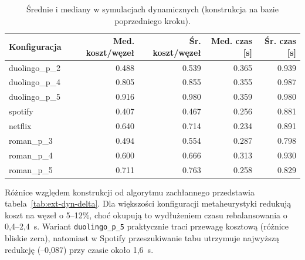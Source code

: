 \begin{table}[H]
  \centering
  \caption{Średnie i mediany w symulacjach dynamicznych (konstrukcja na bazie poprzedniego kroku).}
  \label{tab:ext-dyn-overall}
  \begin{tabular}{lrrrr}
    \toprule
    \textbf{Konfiguracja} & \textbf{Med. koszt/węzeł} & \textbf{Śr. koszt/węzeł} & \textbf{Med. czas [s]} & \textbf{Śr. czas [s]} \\
    \midrule
    duolingo\_p\_2        & 0.488                     & 0.539                    & 0.365                  & 0.939                 \\
    duolingo\_p\_4        & 0.805                     & 0.855                    & 0.355                  & 0.987                 \\
    duolingo\_p\_5        & 0.916                     & 0.980                    & 0.359                  & 0.980                 \\
    spotify               & 0.407                     & 0.467                    & 0.256                  & 0.881                 \\
    netflix               & 0.640                     & 0.714                    & 0.234                  & 0.891                 \\
    roman\_p\_3           & 0.494                     & 0.554                    & 0.287                  & 0.798                 \\
    roman\_p\_4           & 0.600                     & 0.666                    & 0.313                  & 0.930                 \\
    roman\_p\_5           & 0.711                     & 0.763                    & 0.258                  & 0.829                 \\
  \end{tabular}
\end{table}

Różnice względem konstrukcji od algorytmu zachłannego przedstawia tabela~\ref{tab:ext-dyn-delta}. Dla większości konfiguracji metaheurystyki redukują koszt na węzeł o 5--12\%, choć okupują to wydłużeniem czasu rebalansowania o 0,4--2,4~s. Wariant \texttt{duolingo\_p\_5} praktycznie traci przewagę kosztową (różnice bliskie zera), natomiast w Spotify przeszukiwanie tabu utrzymuje najwyższą redukcję (--0,087) przy czasie około 1,6~s.

